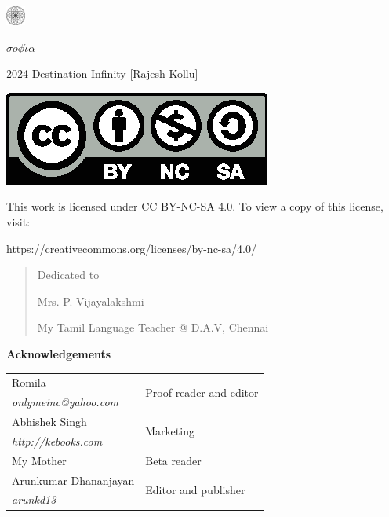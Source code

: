 \begin{center}
\HUGE{\thetitle}
\end{center}
\cleardoublepage

\begin{center}
\HUGE{\thetitle}
\end{center}

\begin{center}
\LARGE{\theauthor}
\end{center}

\vfill

\begin{center}
    \includegraphics[width=18pt]{logo.pdf}

    $\sigma o \phi \acute{\iota} \alpha$
\end{center}
\clearpage

\begingroup
\footnotesize
\setlength{\parindent}{0pt}
\setlength{\parskip}{\baselineskip}

\textcopyright{} 2024 Destination Infinity [Rajesh Kollu]

\includegraphics{by-nc-sa.eps}

This work is licensed under CC BY-NC-SA 4.0. To view a copy of this license,
visit:

https://creativecommons.org/licenses/by-nc-sa/4.0/

\endgroup
\clearpage

\begin{quote}
\begin{center}Dedicated to

\Large
Mrs. P. Vijayalakshmi
\normalsize

My Tamil Language Teacher @ D.A.V, Chennai
\end{center}
\end{quote}

\vfill

\textbf{Acknowledgements}

\footnotesize
\begin{tabular}{ll}
    Romila & \multirow{2}{*}{Proof reader and editor} \\
    \emph{onlymeinc@yahoo.com} & \\
    Abhishek Singh & \multirow{2}{*}{Marketing} \\
    \emph{http://kebooks.com} & \\
    My Mother & Beta reader \\
    Arunkumar Dhananjayan & \multirow{2}{*}{Editor and publisher} \\
    \emph{arunkd13} & \\
\end{tabular}

\clearpage